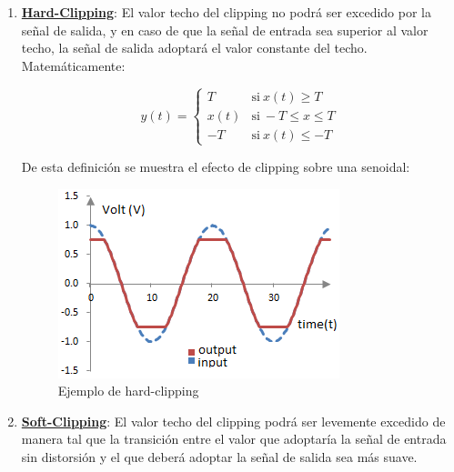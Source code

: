 \documentclass[../../main.tex]{subfiles}
\begin{document}
\begin{enumerate}

\item \underline{\textbf{Hard-Clipping}}: El valor techo del clipping no podrá ser excedido por la señal de salida, y en caso de que la señal de entrada sea superior al valor techo, la señal de salida adoptará el valor constante del techo. Matemáticamente: \par
	 \begin{equation}
    	 \label{eq:aqui-le-mostramos-como-hacerle-la-llave-grande}
  	   y(t) = \left\{
	  	    \begin{array}{ll}
		 					T      & \mathrm{si\ } x(t) \ge T \\
			 				x(t) & \mathrm{si\ } -T \le x \le T \\
			 				-T     & \mathrm{si\ } x(t) \le -T
	     	 \end{array}
	     	\right.
 	\end{equation}
\par
De esta definición se muestra el efecto de clipping sobre una senoidal:

\begin{figure}[H]	%
	\centering
	\includegraphics[scale=1]{imagenes/hard_clipping_grafico_tipico.png}
	\caption{Ejemplo de hard-clipping}
	\label{fig:ej5_hard_clipping_grafico_tipico}
\end{figure}

\item \underline{\textbf{Soft-Clipping}}: El valor techo del clipping podrá ser levemente excedido de manera tal que la transición entre el valor que adoptaría la señal de entrada sin distorsión y el que deberá adoptar la señal de salida sea más suave.\par


\end{enumerate}
\end{document}
